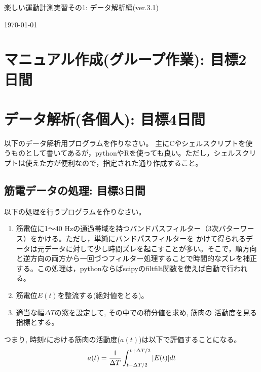 \documentclass{jsarticle}
\def\version{3.1}
\begin{document}
\begin{center}
  {\LARGE 楽しい運動計測実習その1: データ解析編(ver.\version)}
\end{center}
\begin{flushright}
\today
\end{flushright}



\section{マニュアル作成(グループ作業): 目標2日間}


\section{データ解析(各個人): 目標4日間}
以下のデータ解析用プログラムを作りなさい。
主にCやシェルスクリプトを使うものとして書いてあるが，pythonやRを使っても良い。ただし，シェルスクリプトは使えた方が便利なので，指定された通り作成すること。

\subsection{筋電データの処理: 目標3日間}
以下の処理を行うプログラムを作りなさい。
\begin{enumerate}
\item 筋電位に1〜40 Hzの通過帯域を持つバンドパスフィルター（3次バターワース）をかける。ただし，単純にバンドパスフィルターを
かけて得られるデータは元データに対して少し時間ズレを起こすことが多い。そこで，順方向と逆方向の両方から一回づつフィルター処理することで時間的なズレを補正する。この処理は，pythonならばscipyのfiltfilt関数を使えば自動で行われる。
\item 筋電位$E(t)$を整流する(絶対値をとる)。
\item 適当な幅$\Delta T$の窓を設定して, その中での積分値を求め, 筋肉の
  活動度を見る指標とする。
\end{enumerate}
つまり, 時刻$t$における筋肉の活動度($a(t)$)は以下で評価することになる。
\begin{align}
  a(t)=\frac{1}{\Delta T}\int_{t-\Delta T/2}^{t+\Delta T/2}|E(t)|dt\notag
\end{align}
\end{document}
